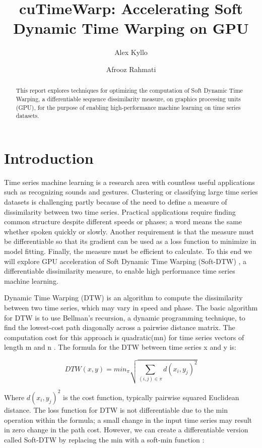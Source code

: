 \documentclass[11pt, letterpaper]{article}
\title{cuTimeWarp: Accelerating Soft Dynamic Time Warping on GPU}
\author{Alex Kyllo \and Afrooz Rahmati}
\begin{document}
\maketitle

\begin{abstract}

This report explores techniques for optimizing the computation of Soft Dynamic
Time Warping, a differentiable sequence dissimilarity measure, on graphics
processing units (GPU), for the purpose of enabling high-performance machine
learning on time series datasets.

\end{abstract}

\section{Introduction}

Time series machine learning is a research area with countless useful
applications such as recognizing sounds and gestures. Clustering or classifying
large time series datasets is challenging partly because of the need to define a
measure of dissimilarity between two time series. Practical applications require
finding common structure despite different speeds or phases; a word means the
same whether spoken quickly or slowly. Another requirement is that the measure
must be differentiable so that its gradient can be used as a loss function to
minimize in model fitting. Finally, the measure must be efficient to calculate.
To this end we will explore GPU acceleration of Soft Dynamic Time Warping
(Soft-DTW) \cite{cuturi_soft-dtw_2018}, a differentiable dissimilarity measure,
to enable high performance time series machine learning.

Dynamic Time Warping (DTW) is an algorithm to compute the dissimilarity between
two time series, which may vary in speed and phase. The basic algorithm for DTW
is to use Bellman’s recursion, a dynamic programming technique, to find the
lowest-cost path diagonally across a pairwise distance matrix. The computation
cost for this approach is quadratic(mn) for time series vectors of length m and
n \cite{cuturi_soft-dtw_2018}. The formula for the DTW between time series x and
y is: 

$$DTW(x,y) = min_{\pi}\sqrt{\sum_{(i,j)\in\pi}d(x_{i},y_{j})^2}$$

Where $d(x_i,y_j)^2$ is the cost function, typically pairwise squared Euclidean
distance. The loss function for DTW is not differentiable due to the min
operation within the formula; a small change in the input time series may result
in zero change in the path cost. However, we can create a differentiable version
called Soft-DTW by replacing the min with a soft-min function
\cite{cuturi_soft-dtw_2018}:
\end{document}
